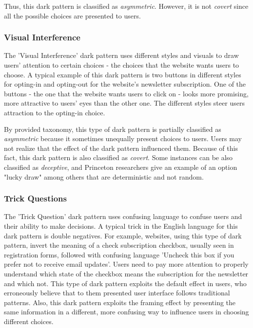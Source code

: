         Thus, this dark pattern is classified as \emph{asymmetric}. However, it is not \emph{covert} since all the possible choices are presented to users.
        \subsubsection*{Visual Interference}
        The 'Visual Interference' dark pattern uses different styles and visuals to draw users' attention to certain choices - the choices that the website wants users to choose. A typical example of this dark pattern is two buttons in different styles for opting-in and opting-out for the website's newsletter subscription. One of the buttons - the one that the website wants users to click on - looks more promising, more attractive to users' eyes than the other one. The different styles steer users attraction to the opting-in choice. 
        
        By provided taxonomy, this type of dark pattern is partially classified as \emph{asymmetric} because it sometimes unequally present choices to users. Users may not realize that the effect of the dark pattern influenced them. Because of this fact, this dark pattern is also classified as \emph{covert}. Some instances can be also classified as \emph{deceptive}, and Princeton researchers give an example of an option "lucky draw" among others that are deterministic and not random.
        \subsubsection*{Trick Questions}
        The 'Trick Question' dark pattern uses confusing language to confuse users and their ability to make decisions. A typical trick in the English language for this dark pattern is double negatives. For example, websites, using this type of dark pattern, invert the meaning of a check subscription checkbox, usually seen in registration forms, followed with confusing language 'Uncheck this box if you prefer not to receive email updates'. Users need to pay more attention to properly understand which state of the checkbox means the subscription for the newsletter and which not. This type of dark pattern exploits the default effect in users, who erroneously believe that to them presented user interface follows traditional patterns. Also, this dark pattern exploits the framing effect by presenting the same information in a different, more confusing way to influence users in choosing different choices. 
        
